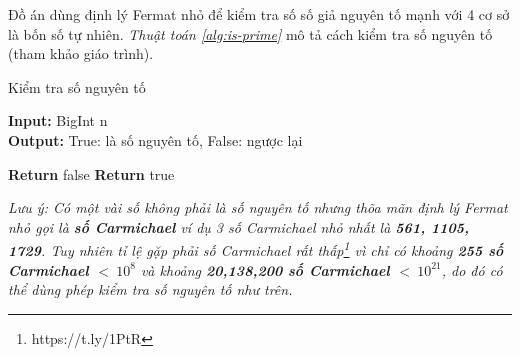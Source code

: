 Đồ án dùng định lý Fermat nhỏ để kiểm tra số số giả nguyên tố mạnh với 4 cơ sở là bốn số tự nhiên. \textit{Thuật toán \ref{alg:is-prime}} mô tả cách kiểm tra số nguyên 
tố (tham khảo giáo trình).

\begin{algorithm}
\caption{Kiểm tra số nguyên tố}\label{alg:is-prime}
\hspace*{\algorithmicindent} \textbf{Input:} BigInt n\\
\hspace*{\algorithmicindent} \textbf{Output:} True: là số nguyên tố, False: ngược lại 
\begin{algorithmic}[1]
\State \textbf{Return } false
\EndIf
\EndFor
\State \textbf{Return } true
\EndProcedure
\end{algorithmic}
\end{algorithm}

\textit{Lưu ý: Có một vài số không phải là số nguyên tố nhưng thõa mãn định lý Fermat nhỏ gọi là \textbf{số Carmichael} ví dụ 3 số Carmichael nhỏ nhất là \textbf{561, 1105, 1729}. Tuy nhiên tỉ lệ gặp phải số Carmichael rất thấp\footnote{https://t.ly/1PtR} vì chỉ có khoảng \textbf{255 số Carmichael $<\ 10^8$} và khoảng \textbf{20,138,200 số Carmichael $<\ 10^{21}$}, do đó có thể dùng phép kiểm tra số nguyên tố như trên.}